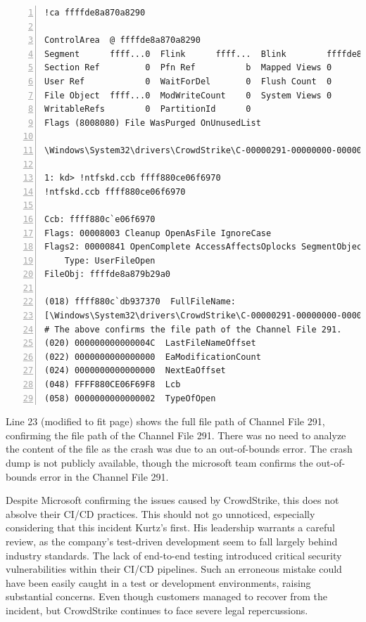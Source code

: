 \begin{lstlisting}[caption=Inspecting csagent.sys, numbers=left]
!ca ffffde8a870a8290

ControlArea  @ ffffde8a870a8290
Segment      ffff...0  Flink      ffff...  Blink        ffffde8a870a7d98
Section Ref         0  Pfn Ref          b  Mapped Views 0
User Ref            0  WaitForDel       0  Flush Count  0
File Object  ffff...0  ModWriteCount    0  System Views 0
WritableRefs        0  PartitionId      0  
Flags (8008080) File WasPurged OnUnusedList 

\Windows\System32\drivers\CrowdStrike\C-00000291-00000000-00000032.sys
    
1: kd> !ntfskd.ccb ffff880ce06f6970
!ntfskd.ccb ffff880ce06f6970
    
Ccb: ffff880c`e06f6970
Flags: 00008003 Cleanup OpenAsFile IgnoreCase
Flags2: 00000841 OpenComplete AccessAffectsOplocks SegmentObjectReferenced
    Type: UserFileOpen
FileObj: ffffde8a879b29a0
    
(018) ffff880c`db937370  FullFileName: 
[\Windows\System32\drivers\CrowdStrike\C-00000291-00000000-00000032.sys]
# The above confirms the file path of the Channel File 291.
(020) 000000000000004C  LastFileNameOffset 
(022) 0000000000000000  EaModificationCount 
(024) 0000000000000000  NextEaOffset 
(048) FFFF880CE06F69F8  Lcb 
(058) 0000000000000002  TypeOfOpen 
\end{lstlisting}

\noindent

\noindent
Line 23 (modified to fit page) shows the full file path of Channel File 291, confirming the file path of the Channel File 291.
There was no need to analyze the content of the file as the crash was due to an out-of-bounds error. The 
crash dump is not publicly available, though the microsoft team confirms the out-of-bounds error in the Channel File 291.

Despite Microsoft confirming the issues caused by CrowdStrike, this does not absolve their CI/CD practices.
This should not go unnoticed, especially considering that this incident Kurtz's first.
His leadership warrants a careful review, as the company's test-driven development seem to fall largely behind industry standards.
The lack of end-to-end testing introduced critical security vulnerabilities within their CI/CD pipelines. Such an erroneous
mistake could have been easily caught in a test or development environments, raising substantial concerns.
Even though customers managed to recover from the incident, but CrowdStrike continues to face severe legal repercussions.

